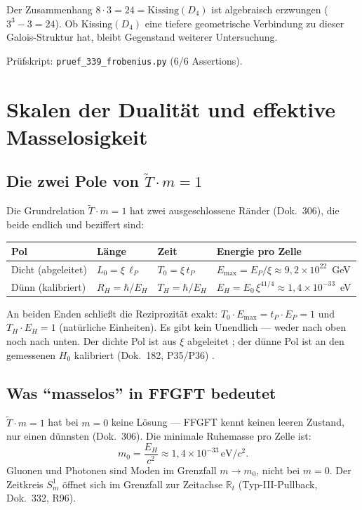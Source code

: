 Der Zusammenhang $8\cdot3=24=\mathrm{Kissing}(D_4)$ ist algebraisch erzwungen
($3^3-3=24$). Ob Kissing$(D_4)$ eine tiefere geometrische Verbindung zu dieser
Galois-Struktur hat, bleibt Gegenstand weiterer Untersuchung.

Prüfskript: \texttt{pruef\_339\_frobenius.py} (6/6 Assertions).

\section{Skalen der Dualität und effektive Masselosigkeit \KM}

\subsection{Die zwei Pole von $\tilde{T}\cdot m = 1$}

Die Grundrelation $\tilde{T}\cdot m=1$ hat zwei ausgeschlossene Ränder
(Dok.~306), die beide endlich und beziffert sind:

\begin{center}
\renewcommand{\arraystretch}{1.3}
\begin{tabular}{llll}
\toprule
Pol & Länge & Zeit & Energie pro Zelle \\
\midrule
Dicht (abgeleitet) & $L_0=\xi\,\ell_P$ & $T_0=\xi\,t_P$ & $E_\text{max}=E_P/\xi\approx9{,}2\times10^{22}$~GeV \\
Dünn (kalibriert) & $R_H=\hbar/E_H$ & $T_H=\hbar/E_H$ & $E_H=E_0\,\xi^{41/4}\approx1{,}4\times10^{-33}$~eV \\
\bottomrule
\end{tabular}
\end{center}

An beiden Enden schließt die Reziprozität exakt:
$T_0\cdot E_\text{max} = t_P\cdot E_P = 1$ und $T_H\cdot E_H = 1$
(natürliche Einheiten). Es gibt kein Unendlich — weder nach oben noch
nach unten. Der dichte Pol ist aus $\xi$ abgeleitet \BM; der dünne Pol
ist an den gemessenen $H_0$ kalibriert (Dok.~182, P35/P36) \SM.

\subsection{Was ``masselos'' in FFGFT bedeutet}

$\tilde{T}\cdot m=1$ hat bei $m=0$ keine Lösung — FFGFT kennt keinen
leeren Zustand, nur einen dünnsten (Dok.~306). Die minimale Ruhemasse
pro Zelle ist:
\[
m_0 = \frac{E_H}{c^2} \approx 1{,}4\times10^{-33}\,\text{eV}/c^2.
\]
Gluonen und Photonen sind Moden im Grenzfall $m\to m_0$, nicht bei
$m=0$. Der Zeitkreis $S^1_m$ öffnet sich im Grenzfall zur Zeitachse
$\mathbb{R}_t$ (Typ-III-Pullback, Dok.~332, R96).


